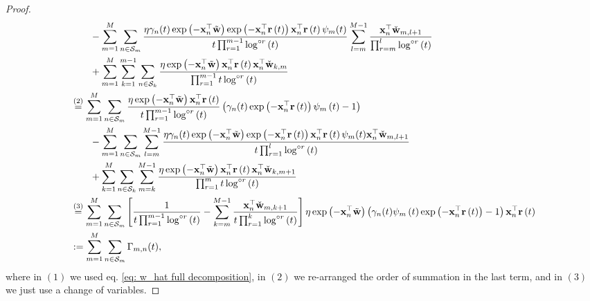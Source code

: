 \documentclass[twoside,11pt,english]{article}
\begin{document}
\begin{proof}
{\begin{align}
&\quad\quad-\sum_{m=1}^{M}\sum_{n\in\mathcal{S}_{m}}\frac{\eta\gamma_n(t)\exp\left(-\mathbf{x}_{n}^{\top}\tilde{\mathbf{w}}\right)\exp\left(-\mathbf{x}_{n}^{\top}\mathbf{r}\left(t\right)\right)\mathbf{x}_{n}^{\top}\mathbf{r}\left(t\right)\psi_{m}(t)}{t\prod_{r=1}^{m-1}\log^{\circ r}\left(t\right)}\sum_{l=m}^{M-1}\frac{\mathbf{x}_{n}^{\top}\check{\mathbf{w}}_{m,l+1}}{\prod_{r=m}^{l}\log^{\circ r}\left(t\right)}\nonumber\\
&\quad\quad+\sum_{m=1}^{M}\sum_{k=1}^{m-1}\sum_{n\in\mathcal{S}_k}\frac{\eta\exp\left(-\mathbf{x}_{n}^{\top}\tilde{\mathbf{w}}\right)\mathbf{x}_{n}^{\top}\mathbf{r}\left(t\right)\mathbf{x}_{n}^{\top}\check{\mathbf{w}}_{k,m}}{\prod_{r=1}^{m-1}t\log^{\circ r}\left(t\right)}\nonumber\\
&\overset{\left(2\right)}{=}\sum_{m=1}^{M}\sum_{n\in\mathcal{S}_{m}}\frac{\eta\exp\left(-\mathbf{x}_{n}^{\top}\tilde{\mathbf{w}}\right)\mathbf{x}_{n}^{\top}\mathbf{r}\left(t\right)}{t\prod_{r=1}^{m-1}\log^{\circ r}\left(t\right)}\left(\gamma_n(t)\exp\left(-\mathbf{x}_{n}^{\top}\mathbf{r}\left(t\right)\right)
\psi_{m}\left(t\right)-1\right)\nonumber\\
&\quad\quad-\sum_{m=1}^{M}\sum_{n\in\mathcal{S}_{m}}\sum_{l=m}^{M-1}\frac{\eta\gamma_n(t)\exp\left(-\mathbf{x}_{n}^{\top}\tilde{\mathbf{w}}\right)\exp\left(-\mathbf{x}_{n}^{\top}\mathbf{r}\left(t\right)\right)\mathbf{x}_{n}^{\top}\mathbf{r}\left(t\right)\psi_{m}(t)\mathbf{x}_{n}^{\top}\check{\mathbf{w}}_{m,l+1}}{t\prod_{r=1}^{l}\log^{\circ r}\left(t\right)}\nonumber\\
&\quad\quad+\sum_{k=1}^{M}\sum_{n\in\mathcal{S}_k}\sum_{m=k}^{M-1}\frac{\eta\exp\left(-\mathbf{x}_{n}^{\top}\tilde{\mathbf{w}}\right)\mathbf{x}_{n}^{\top}\mathbf{r}\left(t\right)\mathbf{x}_{n}^{\top}\check{\mathbf{w}}_{k,m+1}}{\prod_{r=1}^{m}t\log^{\circ r}\left(t\right)}\nonumber\\
&\overset{\left(3\right)}{=} \sum_{m=1}^{M}\sum_{n\in\mathcal{S}_{m}}\left[\frac{1}{t\prod_{r=1}^{m-1}\log^{\circ r}\left(t\right)}-\sum_{k=m}^{M-1}\frac{\mathbf{x}_{n}^{\top}\check{\mathbf{w}}_{m,k+1}}{t\prod_{r=1}^{k}\log^{\circ r}\left(t\right)}\right]\eta\exp\left(-\mathbf{x}_{n}^{\top}\tilde{\mathbf{w}}\right)\left(\gamma_n(t)\psi_{m}\left(t\right)\exp\left(-\mathbf{x}_{n}^{\top}\mathbf{r}\left(t\right)\right)-1\right)\mathbf{x}_{n}^{\top}\mathbf{r}\left(t\right)\nonumber\\
&:= \sum_{m=1}^{M}\sum_{n\in\mathcal{S}_{m}} \Gamma_{m,n}(t),\label{eq: the last term}
\end{align}}
where in $\left(1\right)$ we used eq. \ref{eq: w_hat full decomposition}, in $\left(2\right)$
we re-arranged the order of summation in the last term, and in $(3)$ we just use a change of variables.  


\end{proof}
\end{document}
